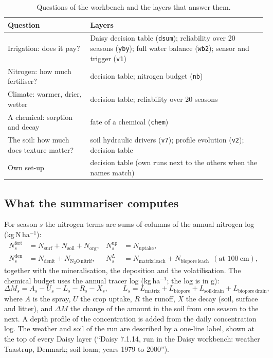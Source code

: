 \begin{table}[H]\centering\small
\caption{Questions of the workbench and the layers that answer them.}\label{tab:match}
\begin{tabularx}{\textwidth}{>{\raggedright\arraybackslash}p{3.2cm}X}
\toprule Question & Layers\\\midrule
Irrigation: does it pay? & Daisy decision table (\texttt{dsum}); reliability over 20 seasons (\texttt{yby}); full water balance (\texttt{wb2}); sensor and trigger (\texttt{v1})\\
Nitrogen: how much fertiliser? & decision table; nitrogen budget (\texttt{nb})\\
Climate: warmer, drier, wetter & decision table; reliability over 20 seasons\\
A chemical: sorption and decay & fate of a chemical (\texttt{chem})\\
The soil: how much does texture matter? & soil hydraulic drivers (\texttt{v7}); profile evolution (\texttt{v2}); decision table\\
Own set-up & decision table (own runs next to the others when the names match)\\\bottomrule
\end{tabularx}
\end{table}

\subsection{What the summariser computes}
For season $s$ the nitrogen terms are sums of columns of the annual nitrogen log (kg\,N\,ha$^{-1}$):
\begin{equation}\label{eq:nsum}
\begin{aligned}
N^{\mathrm{fert}}_s&=N_{\mathrm{surf}}+N_{\mathrm{soil}}+N_{\mathrm{org}}, & N^{\mathrm{up}}_s&=N_{\mathrm{uptake}},\\
N^{\mathrm{den}}_s&=N_{\mathrm{denit}}+N_{\mathrm{N_2O\,nitrif}}, & N^{L}_s&=N_{\mathrm{matrix\,leach}}+N_{\mathrm{biopore\,leach}}\ \ (\text{at }100\ \mathrm{cm}),
\end{aligned}
\end{equation}
together with the mineralisation, the deposition and the volatilisation. The chemical budget uses the annual tracer log (kg\,ha$^{-1}$; the log is in g):
\begin{equation}\label{eq:chem}
\Delta M_s = A_s - U_s - L_s - R_s - X_s,\qquad L_s=L_{\mathrm{matrix}}+L_{\mathrm{biopore}}+L_{\mathrm{soil\,drain}}+L_{\mathrm{biopore\,drain}},
\end{equation}
where $A$ is the spray, $U$ the crop uptake, $R$ the runoff, $X$ the decay (soil, surface and litter), and $\Delta M$ the change of the amount in the soil from one season to the next. A depth profile of the concentration is added from the daily concentration log. The weather and soil of the run are described by a one-line label, shown at the top of every Daisy layer (``Daisy 7.1.14, run in the Daisy workbench: weather Taastrup, Denmark; soil loam; years 1979 to 2000'').

